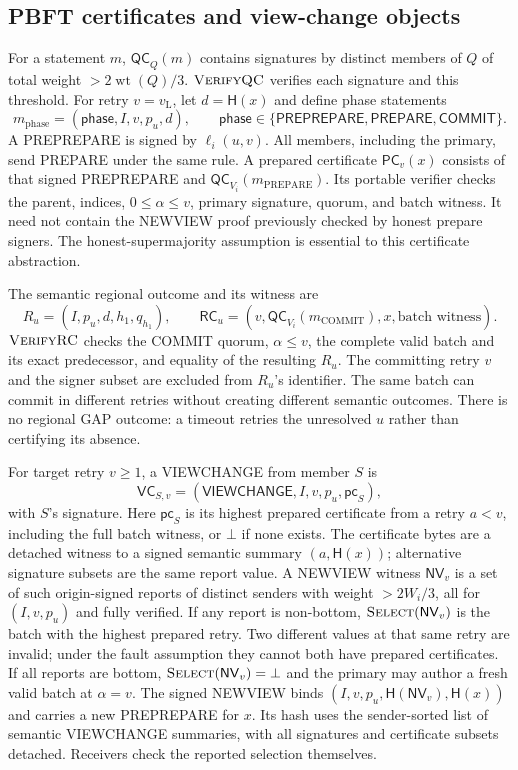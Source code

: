 \documentclass[11pt,a4paper,onecolumn]{article}
\newcommand{\Hash}{\mathsf H}
\newcommand{\QC}{\mathsf{QC}}
\newcommand{\RC}{\mathsf{RC}}
\newcommand{\lv}{v_{\mathrm L}}
\newcommand{\PC}{\mathsf{PC}}
\newcommand{\NV}{\mathsf{NV}}
\newcommand{\botv}{\bot}
\newcommand{\wt}{\operatorname{wt}}
\newcommand{\Tag}[1]{\mathsf{#1}}
\newcommand{\Proc}[1]{\textnormal{\textsc{#1}}}
\theoremstyle{remark}\newtheorem{example}[definition]{Example}
\begin{document}
\subsection{PBFT certificates and view-change objects}\label{sec:pbftobjects}
For a statement $m$, $\QC_Q(m)$ contains signatures by distinct members of $Q$
of total weight $>2\wt(Q)/3$. $\Proc{VerifyQC}$ verifies each signature and this
threshold. For retry $v=\lv$, let $d=\Hash(x)$ and define phase statements
\[
 m_{\mathrm{phase}}=(\Tag{phase},I,v,p_u,d),\qquad
 \mathsf{phase}\in\{\mathsf{PREPREPARE},\mathsf{PREPARE},\mathsf{COMMIT}\}.
\]
A PREPREPARE is signed by $\ell_i(u,v)$. All members, including the primary,
send PREPARE under the same rule. A prepared certificate $\PC_v(x)$ consists
of that signed PREPREPARE and $\QC_{V_i}(m_{\mathrm{PREPARE}})$.
Its portable verifier checks the parent, indices, $0\leq\alpha\leq v$,
primary signature, quorum, and batch witness. It need not contain the NEWVIEW proof previously checked
by honest prepare signers. The honest-supermajority assumption is essential
to this certificate abstraction.

The semantic regional outcome and its witness are
\begin{equation}\label{eq:rc}
 R_u=(I,p_u,d,h_1,q_{h_1}),\qquad
 \RC_u=(v,\QC_{V_i}(m_{\mathrm{COMMIT}}),x,\text{batch witness}).
\end{equation}
$\Proc{VerifyRC}$ checks the COMMIT quorum, $\alpha\leq v$, the complete valid
batch and its exact predecessor, and equality of the resulting $R_u$.
The committing retry $v$ and the signer subset are excluded from $R_u$'s
identifier. The same batch can commit in different retries without creating
different semantic outcomes. There is no regional GAP outcome: a timeout
retries the unresolved $u$ rather than certifying its absence.

For target retry $v\geq1$, a VIEWCHANGE from member $S$ is
\[
 \mathsf{VC}_{S,v}=(\Tag{VIEWCHANGE},I,v,p_u,\mathsf{pc}_S),
\]
with $S$'s signature. Here $\mathsf{pc}_S$ is its highest prepared certificate
from a retry $a<v$, including the full batch witness, or $\botv$ if none exists.
The certificate bytes are a detached witness to a signed semantic summary
$(a,\Hash(x))$; alternative signature subsets are the same report value.
A NEWVIEW witness $\NV_v$ is a set of such origin-signed reports of distinct
senders with weight $>2W_i/3$, all for $(I,v,p_u)$ and fully verified.
If any report is non-bottom, $\Proc{Select}(\NV_v)$ is the batch with the
highest prepared retry. Two different values at that same retry are invalid;
under the fault assumption they cannot both have prepared certificates.
If all reports are bottom, $\Proc{Select}(\NV_v)=\botv$ and the primary may
author a fresh valid batch at $\alpha=v$.
The signed NEWVIEW binds $(I,v,p_u,\Hash(\NV_v),\Hash(x))$ and carries a new
PREPREPARE for $x$. Its hash uses the sender-sorted list of semantic
VIEWCHANGE summaries, with all signatures and certificate subsets detached.
Receivers check the reported selection themselves.
\end{document}
